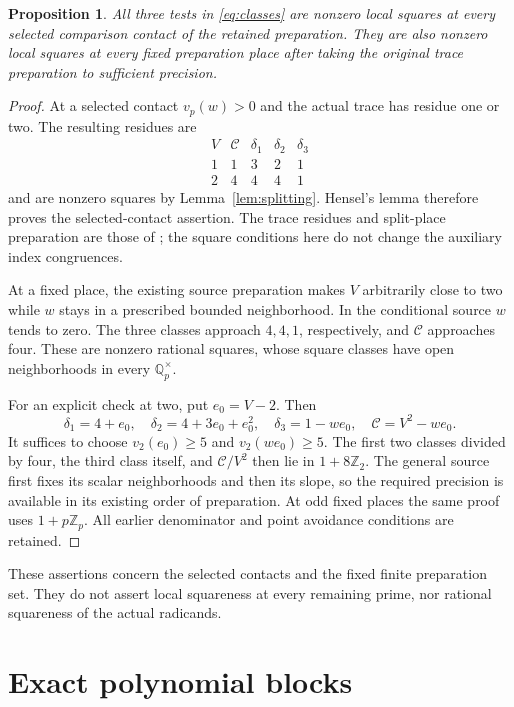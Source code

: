 \documentclass[11pt,a4paper]{article}
\newtheorem{proposition}[theorem]{Proposition}
\newcommand{\Q}{\mathbb Q}\newcommand{\Z}{\mathbb Z}
\begin{document}
\begin{proposition}\label{prop:local}
All three tests in \eqref{eq:classes} are nonzero local squares
at every selected comparison contact of the retained preparation.
They are also nonzero local squares at every fixed preparation place
after taking the original trace preparation to sufficient precision.
\end{proposition}
\begin{proof}
At a selected contact $v_p(w)>0$ and the actual trace has residue
one or two. The resulting residues are
\[
\begin{array}{c|cccc}
V&\mathcal C&\delta_1&\delta_2&\delta_3\\\hline
1&1&3&2&1\\
2&4&4&4&1
\end{array}
\]
and are nonzero squares by Lemma~\ref{lem:splitting}.
Hensel's lemma therefore proves the selected-contact assertion.
The trace residues and split-place preparation are those of
\cite{General,Conditional,Native}; the square conditions here do
not change the auxiliary index congruences.

At a fixed place, the existing source preparation makes $V$
arbitrarily close to two while $w$ stays in a prescribed bounded
neighborhood. In the conditional source $w$ tends to zero.
The three classes approach $4,4,1$, respectively, and
$\mathcal C$ approaches four. These are nonzero rational squares,
whose square classes have open neighborhoods in every
$\Q_p^\times$.

For an explicit check at two, put $e_0=V-2$. Then
\[
 \delta_1=4+e_0,\quad
 \delta_2=4+3e_0+e_0^2,\quad
 \delta_3=1-we_0,\quad
 \mathcal C=V^2-we_0.
\]
It suffices to choose
$v_2(e_0)\ge5$ and $v_2(we_0)\ge5$. The first two classes
divided by four, the third class itself, and
$\mathcal C/V^2$ then lie in $1+8\Z_2$.
The general source first fixes its scalar neighborhoods and then
its slope, so the required precision is available in its existing
order of preparation. At odd fixed places the same proof uses
$1+p\Z_p$. All earlier denominator and point avoidance conditions
are retained.
\end{proof}

These assertions concern the selected contacts and the fixed finite
preparation set. They do not assert local squareness at every
remaining prime, nor rational squareness of the actual radicands.

\section{Exact polynomial blocks}
\end{document}
